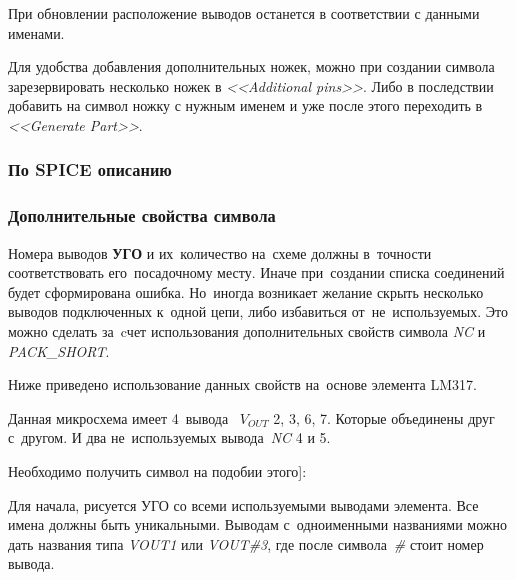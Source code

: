 При обновлении расположение выводов останется в соответствии с данными именами. 

Для удобства добавления дополнительных ножек, можно при создании символа зарезервировать несколько ножек в \textit{<<Additional pins>>}. Либо в последствии добавить на символ ножку с нужным именем и уже после этого переходить в \textit{<<Generate Part>>}. 

\subsubsection{По SPICE описанию} \label{sssec:create_symbol_spice}


\subsubsection{Дополнительные свойства символа} \label{sssec:create_symbol_spice}

Номера выводов \textbf{УГО} и их~количество на~схеме должны в~точности соответствовать его~посадочному месту. Иначе при~создании списка соединений будет сформирована ошибка. Но~иногда возникает желание скрыть несколько выводов подключенных к~одной цепи, либо избавиться от~не~используемых. Это можно сделать за~cчет использования дополнительных свойств символа \textit{NC} и \textit{PACK\_SHORT}.

Ниже приведено использование данных свойств на~основе элемента LM317.

Данная микросхема имеет 4~вывода~ $V_{OUT}$ 2, 3, 6, 7. Которые объединены друг с~другом. И два не~используемых вывода~\textit{NC} 4 и 5.
	\begin{figure}[H]
	\end{figure}
	
Необходимо получить символ на подобии этого]:	
	\begin{figure}[H]
	\end{figure}
	
Для начала, рисуется УГО со всеми используемыми выводами элемента. Все имена должны быть уникальными. Выводам с~одноименными названиями можно дать названия типа \textit{VOUT1} или \textit{VOUT\#3}, где после символа~\textit{\#} стоит номер вывода.
	\begin{figure}[H]
	\end{figure}

